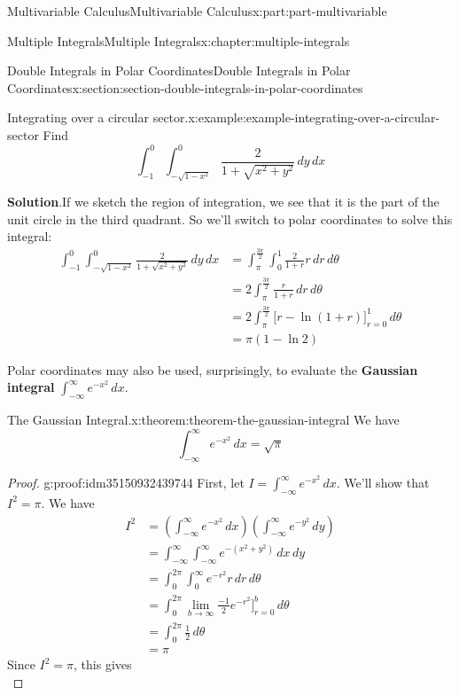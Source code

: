 \documentclass[twoside,10pt,]{tufte-book}
\newcommand{\blocktitlefont}{\relax}
\newcommand{\terminology}[1]{\textbf{#1}}
\numberwithin{equation}{part}
\begin{document}
\begin{partptx}{Multivariable Calculus}{}{Multivariable Calculus}{}{}{x:part:part-multivariable}
\begin{chapterptx}{Multiple Integrals}{}{Multiple Integrals}{}{}{x:chapter:multiple-integrals}
\begin{sectionptx}{Double Integrals in Polar Coordinates}{}{Double Integrals in Polar Coordinates}{}{}{x:section:section-double-integrals-in-polar-coordinates}
\begin{example}{Integrating over a circular sector.}{x:example:example-integrating-over-a-circular-sector}
Find%
\begin{equation*}
\int_{-1}^{0}\int_{-\sqrt{1-x^{2}}}^{0}\frac{2}{1+\sqrt{x^{2} + y^{2}}}\,dy\,dx
\end{equation*}
%
\par\smallskip%
\noindent\textbf{\blocktitlefont Solution}.\hypertarget{g:solution:idm35150932387136}{}\quad{}If we sketch the region of integration, we see that it is the part of the unit circle in the third quadrant. So we'll switch to polar coordinates to solve this integral:%
\begin{align*}
\int_{-1}^{0}\int_{-\sqrt{1-x^{2}}}^{0}\frac{2}{1+\sqrt{x^{2} + y^{2}}}\,dy\,dx & = \int_{\pi}^{\frac{3\pi}{2}}\int_{0}^{1}\frac{2}{1+r}r\,dr\,d\theta \\
& = 2\int_{\pi}^{\frac{3\pi}{2}} \frac{r}{1+r}\,dr\,d\theta \\
& = 2\int_{\pi}^{\frac{3\pi}{2}} \bigg[r - \ln(1+r)\bigg]_{r=0}^{1}\,d\theta \\
& = \pi(1-\ln2) 
\end{align*}
%
\end{example}
Polar coordinates may also be used, surprisingly, to evaluate the \terminology{Gaussian integral} \(\int_{-\infty}^{\infty}e^{-x^{2}}\,dx\).%
\begin{theorem}{The Gaussian Integral.}{}{x:theorem:theorem-the-gaussian-integral}%
We have%
\begin{equation*}
\int_{-\infty}^{\infty}e^{-x^{2}}\,dx = \sqrt{\pi}
\end{equation*}
%
\end{theorem}
\begin{proof}{}{g:proof:idm35150932439744}
First, let \(I = \int_{-\infty}^{\infty}e^{-x^{2}}\,dx\). We'll show that \(I^{2} = \pi\). We have%
\begin{align*}
I^{2} & = \left(\int_{-\infty}^{\infty}e^{-x^{2}}\,dx\right)\left(\int_{-\infty}^{\infty}e^{-y^{2}}\,dy\right) \\
& = \int_{-\infty}^{\infty}\int_{-\infty}^{\infty}e^{-(x^{2} + y^{2})}\,dx\,dy \\
& = \int_{0}^{2\pi}\int_{0}^{\infty}e^{-r^{2}}r\,dr\,d\theta \\
& = \int_{0}^{2\pi} \lim_{b\to\infty}\frac{-1}{2}e^{-r^{2}}\bigg]_{r=0}^{b}\,d\theta \\
& = \int_{0}^{2\pi} \frac{1}{2}\,d\theta \\
& = \pi 
\end{align*}
Since \(I^{2} = \pi\), this gives%
\begin{equation*}

\end{equation*}
\end{proof}
\end{sectionptx}
\end{chapterptx}
\end{partptx}
\end{document}
